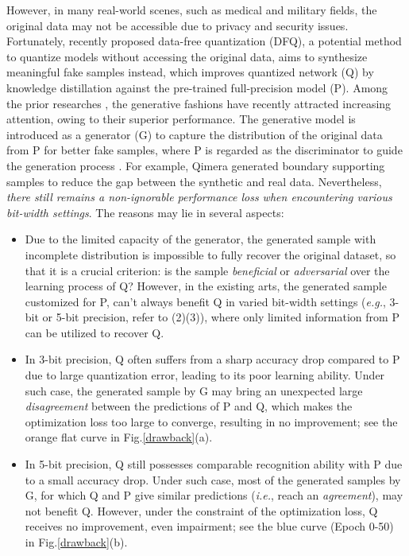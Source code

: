 However, in many real-world scenes, such as medical and military fields, the original data may not be accessible due to privacy and security issues.
Fortunately, recently proposed data-free quantization (DFQ), a potential method to quantize models without accessing the original data, aims to synthesize meaningful fake samples instead, which improves quantized network (Q) by knowledge distillation \cite{hinton2015distilling,qian2022switchable}  against the pre-trained full-precision model (P).
Among the prior researches \cite{cai2020zeroq,zhang2021diversifying}, the generative fashions \cite{xu2020generative,choi2021qimera,zhu2021autorecon} have recently attracted increasing attention, owing to their superior performance. The generative model is introduced as a generator (G) to capture the distribution of the original data from P for better fake samples, where P is regarded as the discriminator to guide the generation process . For example, Qimera \cite{choi2021qimera} generated boundary supporting samples to reduce the gap between the synthetic and real data.
Nevertheless, \emph{there still remains a non-ignorable performance loss when encountering various bit-width settings}. The reasons may lie in several aspects:
\begin{itemize}
    \item[(1)] Due to the limited capacity of the generator, the generated sample with incomplete distribution is impossible to fully recover the original dataset, so that  it is a crucial criterion: is the sample \emph{beneficial} or \emph{adversarial} over the learning process of Q? However, in the existing arts, the generated sample customized for P, can't always benefit Q in varied bit-width settings (\emph{e.g.}, 3-bit or 5-bit precision, refer to (2)(3)), where only limited information from P can be utilized to recover Q.
    \item[(2)] In 3-bit precision, Q often suffers from a sharp accuracy drop compared to P due to large quantization error, leading to its poor learning ability. Under such case, the generated sample by G may bring an unexpected large \emph{disagreement} between the predictions of P and Q, which makes the optimization loss too large to converge, resulting in no improvement; see the \textcolor[RGB]{255,127,14}{orange} flat curve in Fig.\ref{drawback}(a).
    \item[(3)] In 5-bit precision, Q still possesses comparable recognition ability with P due to a small accuracy drop. Under such case, most of the generated samples by G, for which Q and P give similar predictions (\emph{i.e.}, reach an \emph{agreement}), may not benefit Q. However, under the constraint of the optimization loss, Q receives no improvement, even impairment; see the \textcolor[RGB]{30,118,180}{blue} curve (Epoch 0-50) in Fig.\ref{drawback}(b).
\end{itemize}







